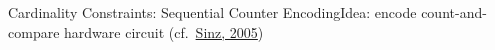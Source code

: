 \documentclass[t]{sdqbeamer}
\begin{document}
\begin{frame}{Cardinality Constraints: Sequential Counter Encoding}{Idea: encode count-and-compare hardware circuit (cf.~\href{https://doi.org/10.1007/11564751\_73}{Sinz, 2005})}
\end{frame}
\end{document}
